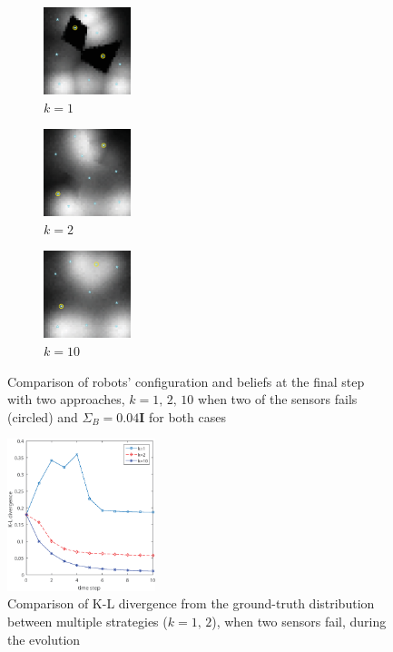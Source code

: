 \documentclass[journal]{IEEEtran}
\begin{document}
\begin{figure}
	\centering
	\begin{subfigure}[b]{0.15\textwidth}
		\centering
		\includegraphics[width=1in]{figure/fault_order_1}
		\caption{$k=1$}
	\end{subfigure}
	\begin{subfigure}[b]{0.15\textwidth}
		\centering
		\includegraphics[width=1in]{figure/fault_order_2}
		\caption{$k=2$}
	\end{subfigure}
	\begin{subfigure}[b]{0.15\textwidth}
	\centering
	\includegraphics[width=1in]{figure/fault_order_n}
	\caption{$k=10$}
\end{subfigure}
	\caption{Comparison of robots' configuration and beliefs at the final step with two approaches, $k=1, \,2,\,10$ when two of the sensors fails (circled) and $\Sigma_B = 0.04\mathbf{I}$ for both cases }
	\label{fig:fig6}
\end{figure}
\begin{figure}
	\centering
	\includegraphics[width=1.7in]{figure/fault_kl2}
	\caption{Comparison of K-L divergence from the ground-truth distribution between multiple strategies ($k=1,\,2$), when two sensors fail, during the evolution}
	\label{fig:fig7}
\end{figure}
\end{document}

